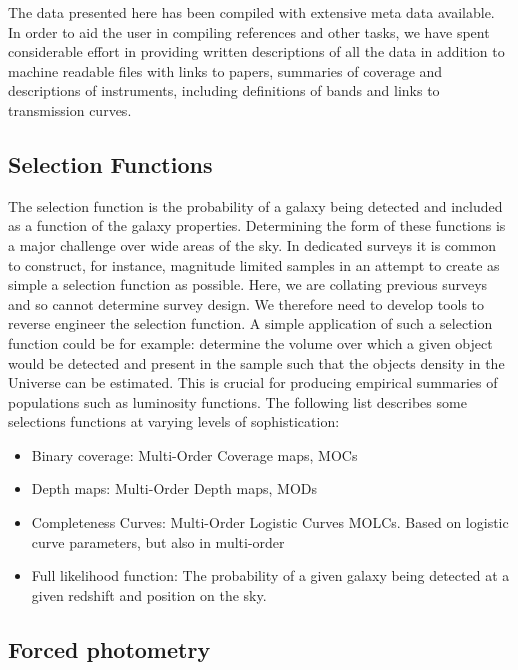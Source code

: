 \documentclass[usenatbib]{mnras}
\begin{document}
The data presented here has been compiled with extensive meta data available. In order to aid the user in compiling references and other tasks, we have spent considerable effort in providing written descriptions of all the data in addition to machine readable files with links to papers, summaries of coverage and descriptions of instruments, including definitions of bands and links to transmission curves.

\subsection{Selection Functions}

The selection function is the probability of a galaxy being detected and included as a function of the galaxy properties. Determining the form of these functions is a major challenge over wide areas of the sky. In dedicated surveys it is common to construct, for instance, magnitude limited samples in an attempt to create as simple a selection function as possible. Here, we are collating previous surveys and so cannot determine survey design. We therefore need to develop tools to reverse engineer the selection function. A simple application of such a selection function could be for example: determine the volume over which a given object would be detected and present in the sample such that the objects density in the Universe can be estimated. This is crucial for producing empirical summaries of populations such as luminosity functions. The following list describes some selections functions at varying levels of sophistication:

\begin{itemize}
  \item{Binary coverage:} Multi-Order Coverage maps, MOCs
  \item{Depth maps:} Multi-Order Depth maps, MODs
  \item{Completeness Curves:} Multi-Order Logistic Curves MOLCs. Based on
    logistic curve parameters, but also in multi-order
  \item{Full likelihood function:} The probability of a given galaxy being detected at a given redshift and position on the sky.
\end{itemize}


\subsection[Forced photometry\\ {\color{red} not done in DR1 so some discussion}]{Forced photometry}
\end{document}

